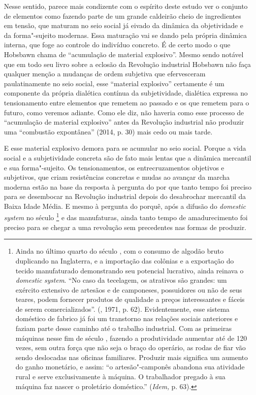 Nesse sentido, parece mais condizente com o espírito deste estudo ver o
conjunto de elementos como fazendo parte de um grande caldeirão cheio de
ingredientes em tensão, que maturam no seio social já eivado da dinâmica
da objetividade e da forma"-sujeito modernas. Essa maturação vai se dando
pela própria dinâmica interna, que foge ao controle do indivíduo
concreto. É de certo modo o que Hobsbawn chama de ``acumulação de
material explosivo''. Mesmo sendo notável que em todo seu livro sobre a
eclosão da Revolução industrial Hobsbawn não faça qualquer menção a
mudanças de ordem subjetiva que efervesceram paulatinamente no seio
social, esse ``material explosivo'' certamente é um componente da
própria dialética contínua da subjetividade, dialética expressa no
tensionamento entre elementos que remetem ao passado e os que remetem
para o futuro, como veremos adiante. Como ele diz, não haveria como esse
processo de ``acumulação de material explosivo'' antes da Revolução
industrial não produzir uma ``combustão expontânea'' (2014, p. 30) mais
cedo ou mais tarde.

E esse material explosivo demora para se acumular no seio social. Porque
a vida social e a subjetividade concreta são de fato mais lentas que a
dinâmica mercantil e sua forma"-sujeito. Os tensionamentos, os
entrecruzamentos objetivos e subjetivos, que criam resistências concretas
e mudas ao avançar da marcha moderna estão na base da resposta à
pergunta do por que tanto tempo foi preciso para se desembocar na
Revolução industrial depois do desabrochar mercantil da Baixa Idade
Média. E mesmo à pergunta do porquê, após a difusão do \emph{domestic system} no
século \footnote{Ainda no último quarto do século , com o
  consumo de algodão bruto duplicando na Inglaterra, e a importação das
  colônias e a exportação do tecido manufaturado demonstrando seu
  potencial lucrativo, ainda reinava o \emph{domestic} \emph{system}.
  ``No caso da tecelagem, os atrativos são grandes: um exército
  extensivo de artesãos e de camponeses, possuidores ou não de seus
  teares, podem fornecer produtos de qualidade a preços interessantes e
  fáceis de serem comercializados''. (, 1971, p. 62).
  Evidentemente, esse sistema doméstico de fabrico já foi um transtorno
  nas relações sociais anteriores e faziam parte desse caminho até o
  trabalho industrial. Com as primeiras máquinas nesse fim de século
  , fazendo a produtividade aumentar até de 120 vezes, sem outra
  força que não seja o braço do operário, as rodas de fiar vão sendo
  deslocadas nas oficinas familiares. Produzir mais significa um aumento
  do ganho monetário, e assim: ``o artesão"-camponês abandona sua
  atividade rural e serve exclusivamente à máquina. O trabalhador
  pregado à sua máquina faz nascer o proletário doméstico.''
  (\emph{Idem,} p. 63).} e das manufaturas, ainda tanto tempo de
amadurecimento foi preciso para se chegar a uma revolução sem
precedentes nas formas de produzir.

